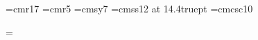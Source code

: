 \font\HUGE=cmr17 %
\font\verysmallrm=cmr5			%
\font\smallsy=cmsy7			%
\def\tiny{\eightpoint\ss}		%
\let\em=\eightssi
\font\quotefont=cmss12 at 14.4truept	%
\font\quoteefont=cmcsc10		%


\newdimen\normalhsize			%
\newdimen\normalvsize			%

\normalhsize=\hsize

%
%
%
\def\newspage{%
	\global\topskip=0pt		%
	\global\hoffset=-.25 true in	%
	\global\pretolerance=1000	%
	\global\tolerance=1500		%
	\global\hyphenpenalty=500	%
	\global\emergencystretch=30pt
	\global\normalhsize=7in
	\global\hsize=\normalhsize	%
	\global\vsize=9in		%
	\global\abovedisplayskip=\baselineskip
	\global\belowdisplayskip=\baselineskip
	\global\pagewidth=\hsize
	\global\pageheight=\vsize
}



